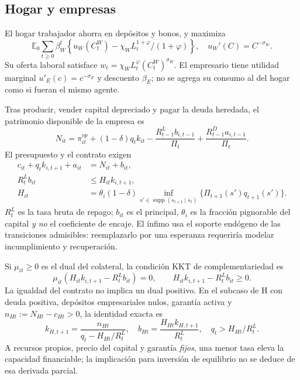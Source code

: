 \subsection{Hogar y empresas}
El hogar trabajador ahorra en depósitos y bonos, y maximiza
\[
\mathbb E_0\sum_{t\geq0}\beta_W^t
\left\{u_W(C^W_t)-\chi_WL_t^{1+\varphi}/(1+\varphi)\right\},
\quad u_W'(C)=C^{-\sigma_W}.
\]
Su oferta laboral satisface
\(w_t=\chi_WL_t^\varphi(C_t^W)^{\sigma_W}\).
El empresario tiene utilidad marginal
\(u'_E(c)=c^{-\sigma_E}\) y descuento \(\beta_E\);
no se agrega su consumo al del hogar como si fueran el mismo agente.

Tras producir, vender capital depreciado y pagar la deuda heredada,
el patrimonio disponible de la empresa es
\begin{equation}\label{eq:compact_wealth}
N_{it}=\pi^{op}_{it}+(1-\delta)q_tk_{it}
-\frac{R^L_{t-1}b_{i,t-1}}{\Pi_t}
+\frac{R^D_{t-1}a_{i,t-1}}{\Pi_t}.
\end{equation}
El presupuesto y el contrato exigen
\begin{align}
c_{it}+q_tk_{i,t+1}+a_{it}&=N_{it}+b_{it},
\label{eq:compact_budget}\\
R^L_tb_{it}&\leq H_{it}k_{i,t+1},\label{eq:compact_contract}\\
H_{it}&=\theta_i(1-\delta)
\inf_{s'\in\operatorname{supp}(s_{t+1}\mid s_t)}
\bigl\{\Pi_{t+1}(s')q_{t+1}(s')\bigr\}.\nonumber
\end{align}
\(R_t^L\) es la tasa bruta de repago; \(b_{it}\) es el principal,
\(\theta_i\) es la fracción pignorable del capital \emph{y no}
el coeficiente de encaje. El ínfimo usa el soporte endógeno de
las transiciones admisibles: reemplazarlo por una esperanza requeriría
modelar incumplimiento y recuperación.

Si \(\mu_{it}\geq0\) es el dual del colateral, la condición KKT
de complementariedad es
\begin{equation}\label{eq:compact_kkt}
\mu_{it}(H_{it}k_{i,t+1}-R_t^Lb_{it})=0,\qquad
H_{it}k_{i,t+1}-R_t^Lb_{it}\geq0.
\end{equation}
La igualdad del contrato no implica un dual positivo. En el
subcaso de H con deuda positiva, depósitos empresariales nulos,
garantía activa y \(n_{Ht}:=N_{Ht}-c_{Ht}>0\), la identidad exacta es
\begin{equation}\label{eq:compact_capacity}
k_{H,t+1}=\frac{n_{Ht}}{q_t-H_{Ht}/R_t^L},
\quad b_{Ht}=\frac{H_{Ht}k_{H,t+1}}{R_t^L},
\quad q_t>H_{Ht}/R_t^L.
\end{equation}
A recursos propios, precio del capital y garantía \emph{fijos},
una menor tasa eleva la capacidad financiable; la implicación
para inversión de equilibrio no se deduce de esa derivada parcial.

